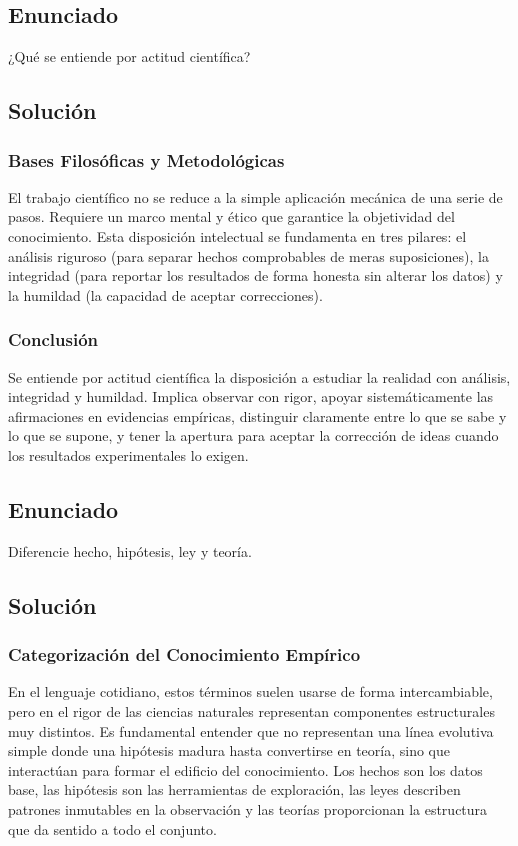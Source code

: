 \documentclass[12pt, a4paper]{article}
\begin{document}
\newpage

\subsection*{Enunciado}
¿Qué se entiende por actitud científica?

\subsection*{Solución}

\subsubsection*{Bases Filosóficas y Metodológicas}
El trabajo científico no se reduce a la simple aplicación mecánica de una serie de pasos. Requiere un marco mental y ético que garantice la objetividad del conocimiento. Esta disposición intelectual se fundamenta en tres pilares: el análisis riguroso (para separar hechos comprobables de meras suposiciones), la integridad (para reportar los resultados de forma honesta sin alterar los datos) y la humildad (la capacidad de aceptar correcciones).

\subsubsection*{Conclusión}
Se entiende por actitud científica la disposición a estudiar la realidad con análisis, integridad y humildad. Implica observar con rigor, apoyar sistemáticamente las afirmaciones en evidencias empíricas, distinguir claramente entre lo que se sabe y lo que se supone, y tener la apertura para aceptar la corrección de ideas cuando los resultados experimentales lo exigen.

\newpage

\subsection*{Enunciado}
Diferencie hecho, hipótesis, ley y teoría.

\subsection*{Solución}

\subsubsection*{Categorización del Conocimiento Empírico}
En el lenguaje cotidiano, estos términos suelen usarse de forma intercambiable, pero en el rigor de las ciencias naturales representan componentes estructurales muy distintos. Es fundamental entender que no representan una línea evolutiva simple donde una hipótesis madura hasta convertirse en teoría, sino que interactúan para formar el edificio del conocimiento. Los hechos son los datos base, las hipótesis son las herramientas de exploración, las leyes describen patrones inmutables en la observación y las teorías proporcionan la estructura que da sentido a todo el conjunto.
\end{document}
